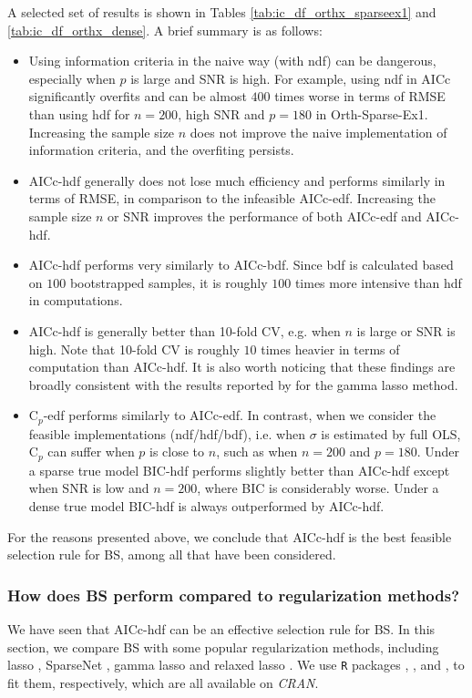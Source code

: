 A selected set of results is shown in Tables \ref{tab:ic_df_orthx_sparseex1} and \ref{tab:ic_df_orthx_dense}. A brief summary is as follows:
\begin{itemize}
	\item Using information criteria in the naive way (with ndf) can be dangerous, especially when $p$ is large and SNR is high. For example, using ndf in AICc significantly overfits and can be almost $400$ times worse in terms of RMSE than using hdf for $n=200$, high SNR and $p=180$ in Orth-Sparse-Ex1. Increasing the sample size $n$ does not improve the naive implementation of information criteria, and the overfiting persists.
	\item AICc-hdf generally does not lose much efficiency and performs similarly in terms of RMSE, in comparison to the infeasible AICc-edf. Increasing the sample size $n$ or SNR improves the performance of both AICc-edf and AICc-hdf. 
	\item AICc-hdf performs very similarly to AICc-bdf. Since bdf is calculated based on $100$ bootstrapped samples, it is roughly $100$ times more intensive than hdf in computations. 
	\item AICc-hdf is generally better than 10-fold CV, e.g. when $n$ is large or SNR is high. Note that 10-fold CV is roughly $10$ times heavier in terms of computation than AICc-hdf. It is also worth noticing that these findings are broadly consistent with the results reported by \citet{Taddy2017} for the gamma lasso method. 
	\item C$_p$-edf performs similarly to AICc-edf. In contrast, when we consider the feasible implementations (ndf/hdf/bdf), i.e. when $\sigma$ is estimated by full OLS, C$_p$ can suffer when $p$ is close to $n$, such as when $n=200$ and $p=180$. Under a sparse true model BIC-hdf performs slightly better than AICc-hdf except when SNR is low and $n=200$, where BIC is considerably worse. Under a dense true model BIC-hdf is always outperformed by AICc-hdf. 
\end{itemize}
For the reasons presented above, we conclude that AICc-hdf is the best feasible selection rule for BS, among all that have been considered.






\subsubsection{How does BS perform compared to regularization methods?}
\label{sec:bs_regu}
We have seen that AICc-hdf can be an effective selection rule for BS. In this section, we compare BS with some popular regularization methods, including lasso \citep{Tibshirani1996}, SparseNet \citep{Mazumder2011}, gamma lasso \citep{Taddy2017} and relaxed lasso \citep{Meinshausen2007}. We use {\tt{R}} packages  \citep{Friedman2010},  \citep{Mazumder2011},  \citep{Taddy2017} and  \citep{Meinshausen2012}, to fit them, respectively, which are all available on \textit{CRAN}.


